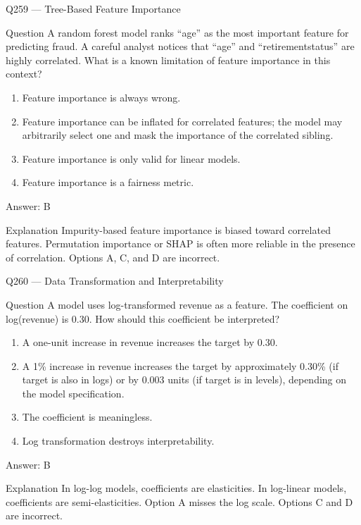 \documentclass[aspectratio=169,8pt]{beamer}
\begin{document}
\begin{frame}{Q259 --- Tree-Based Feature Importance}
\begin{block}{Question}
A random forest model ranks ``age'' as the most important feature for predicting fraud. A careful analyst notices that ``age'' and ``retirementstatus'' are highly correlated. What is a known limitation of feature importance in this context?
\begin{enumerate}
\item Feature importance is always wrong.
\item Feature importance can be inflated for correlated features; the model may arbitrarily select one and mask the importance of the correlated sibling.
\item Feature importance is only valid for linear models.
\item Feature importance is a fairness metric.
\end{enumerate}
\end{block}
\begin{exampleblock}{Answer: B}\end{exampleblock}
\begin{block}{Explanation}
Impurity-based feature importance is biased toward correlated features. Permutation importance or SHAP is often more reliable in the presence of correlation. Options A, C, and D are incorrect.
\end{block}
\end{frame}

\begin{frame}{Q260 --- Data Transformation and Interpretability}
\begin{block}{Question}
A model uses log-transformed revenue as a feature. The coefficient on log(revenue) is 0.30. How should this coefficient be interpreted?
\end{block}
\begin{enumerate}
\item A one-unit increase in revenue increases the target by 0.30.
\item A 1\% increase in revenue increases the target by approximately 0.30\% (if target is also in logs) or by 0.003 units (if target is in levels), depending on the model specification.
\item The coefficient is meaningless.
\item Log transformation destroys interpretability.
\end{enumerate}
\begin{exampleblock}{Answer: B}\end{exampleblock}
\begin{block}{Explanation}
In log-log models, coefficients are elasticities. In log-linear models, coefficients are semi-elasticities. Option A misses the log scale. Options C and D are incorrect.
\end{block}
\end{frame}
\end{document}
